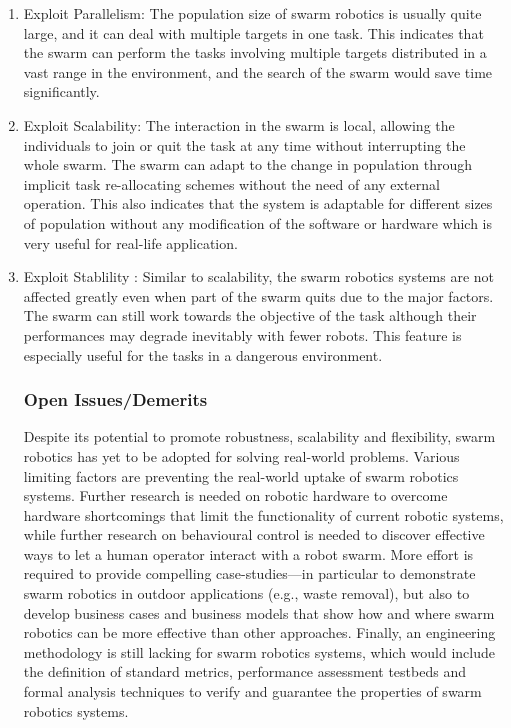 \begin{enumerate}
\item Exploit Parallelism: 
The population size of swarm robotics is usually quite large, and it can deal with multiple targets in one task. This indicates that the swarm can perform the tasks involving multiple targets distributed in a vast range in the environment, and the search of the swarm would save time significantly.
\item Exploit Scalability:
The interaction in the swarm is local, allowing the individuals to join or quit the task at any time without interrupting the whole swarm. The swarm can adapt to the change in population through implicit task re-allocating schemes without the need of any external operation. This also indicates that the system is adaptable for different sizes of population without any modification of the software or hardware which is very useful for real-life application.
\item Exploit Stablility :
Similar to scalability, the swarm robotics systems are not affected greatly even when part of the swarm quits due to the major factors. The swarm can still work towards the objective of the task although their performances may degrade inevitably with fewer robots. This feature is especially useful for the tasks in a dangerous environment.
\subsubsection{Open Issues/Demerits}
Despite its potential to promote robustness, scalability and flexibility, swarm robotics has yet to be adopted for solving real-world problems. Various limiting factors are preventing the real-world uptake of swarm robotics systems. Further research is needed on robotic hardware to overcome hardware shortcomings that limit the functionality of current robotic systems, while further research on behavioural control is needed to discover effective ways to let a human operator interact with a robot swarm. More effort is required to provide compelling case-studies—in particular to demonstrate swarm robotics in outdoor applications (e.g., waste removal), but also to develop business cases and business models that show how and where swarm robotics can be more effective than other approaches. Finally, an engineering methodology is still lacking for swarm robotics systems, which would include the definition of standard metrics, performance assessment testbeds and formal analysis techniques to verify and guarantee the properties of swarm robotics systems.
\end{enumerate}